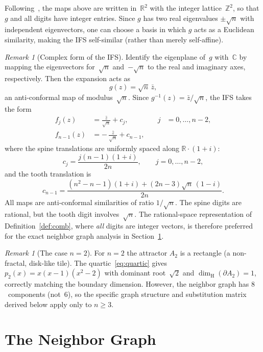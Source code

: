 \documentclass{amsart}
\theoremstyle{definition}
\theoremstyle{remark}
\newtheorem{remark}[theorem]{Remark}
\newcommand{\R}{\mathbb{R}}
\newcommand{\Z}{\mathbb{Z}}
\newcommand{\C}{\mathbb{C}}
\newcommand{\dH}{\dim_{\mathrm{H}}}
\begin{document}
Following~\cite{bandt1991}, the maps above are written in~$\R^2$
with the integer lattice~$\Z^2$, so that $g$ and all digits have
integer entries.  Since $g$ has two real eigenvalues $\pm\sqrt{n}$
with independent eigenvectors, one can choose a basis in which $g$
acts as a Euclidean similarity, making the IFS self-similar
(rather than merely self-affine).

\begin{remark}[Complex form of the IFS]
\label{rem:eigenbasis}
Identify the eigenplane of~$g$ with~$\C$ by mapping the eigenvectors
for~$\sqrt{n}$ and~$-\sqrt{n}$ to the real and imaginary axes,
respectively.  Then the expansion acts as
\[
  g(z) = \sqrt{n}\,\bar{z},
\]
an anti-conformal map of modulus~$\sqrt{n}$.  Since
$g^{-1}(z) = \bar{z}/\sqrt{n}$, the IFS takes the form
\begin{equation}\label{eq:complex-ifs}
\begin{aligned}
  f_j(z) &= \frac{\bar{z}}{\sqrt{n}} + c_j,
    &\quad j &= 0,\ldots,n{-}2, \\[4pt]
  f_{n-1}(z) &= -\,\frac{\bar{z}}{\sqrt{n}} + c_{n-1},
\end{aligned}
\end{equation}
where the spine translations are uniformly spaced along
$\R \cdot (1{+}i)$:
\[
  c_j = \frac{j(n{-}1)(1{+}i)}{2n},
  \qquad j = 0,\ldots,n{-}2,
\]
and the tooth translation is
\[
  c_{n-1} = \frac{(n^2{-}n{-}1)(1{+}i)
             + (2n{-}3)\sqrt{n}\,(1{-}i)}{2n}.
\]
All maps are anti-conformal similarities of ratio
$1/\sqrt{n}$.  The spine digits are rational, but the
tooth digit involves~$\sqrt{n}$.
The rational-space representation of Definition~\ref{def:comb},
where \emph{all} digits are integer vectors, is therefore preferred
for the exact neighbor graph analysis in Section~\ref{sec:osc}.
\end{remark}

\begin{remark}[The case $n = 2$]
\label{rem:n2}
For $n = 2$ the attractor $A_2$ is a rectangle (a non-fractal,
disk-like tile).  The quartic~\eqref{eq:quartic} gives
$p_2(x) = x(x{-}1)(x^2{-}2)$ with dominant root~$\sqrt{2}$ and
$\dH(\partial A_2) = 1$, correctly matching the boundary dimension.
However, the neighbor graph has $8$~components (not~$6$), so the
specific graph structure and substitution matrix derived below
apply only to $n \ge 3$.
\end{remark}

\section{The Neighbor Graph}
\label{sec:osc}
\end{document}

